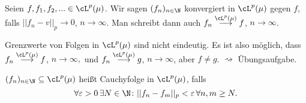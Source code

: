 \begin{deff}
	Seien $f, f_1,f_2,...\in \cL^p(\mu)$. Wir sagen $(f_n)_{n\in \N}$ konvergiert in $\cL^p(\mu)$ gegen $f$, falls $ ||f_n - v||_p \to 0$, $n \to \infty$. Man schreibt dann auch $f_n \overset{\cL^p(\mu)}{\longrightarrow} f$, $n \to \infty$.
\end{deff}

\begin{bem}
	Grenzwerte von Folgen in $\cL^p(\mu)$ sind nicht eindeutig. Es ist also möglich, dass $f_n \overset{\cL^p(\mu)}{\longrightarrow} f$, $n \to \infty,$ und $f_n \overset{\cL^p(\mu)}{\longrightarrow} g$, $n \to \infty$, aber $ f \neq g$. $\rightsquigarrow$ Übungsaufgabe.
\end{bem}

\begin{deff}
	$(f_n)_{n\in\N} \subseteq \cL^p(\mu)$ heißt Cauchyfolge in $\cL^p(\mu)$, falls
	\[ \forall \varepsilon > 0\, \exists N \in \N \colon || f_n - f_m ||_p < \varepsilon\, \forall n,m \geq N. \]
\end{deff}

